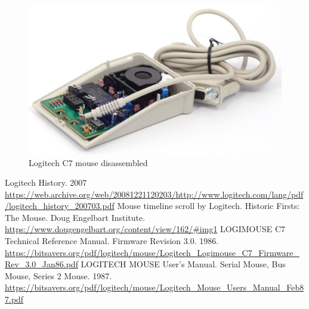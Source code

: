 \documentclass[11pt, a4paper]{article}
\begin{document}
\begin{figure}[h]
    \centering
    \includegraphics[scale=0.7]{1985_logitech_c7_mouse/inside_60.jpg}
    \caption{Logitech C7 mouse disassembled}
    \label{fig:LogitechC7Inside}
\end{figure}

\begin{thebibliography}{9}
 Logitech History. 2007 \url{https://web.archive.org/web/20081221120203/http://www.logitech.com/lang/pdf/logitech_history_200703.pdf}
 Mouse timeline scroll by Logitech. Historic Firsts: The Mouse. Doug Engelbart Institute. \url{https://www.dougengelbart.org/content/view/162/#img1}
 LOGIMOUSE C7 Technical Reference Manual. Firmware Revision 3.0. 1986. \url{https://bitsavers.org/pdf/logitech/mouse/Logitech_Logimouse_C7_Firmware_Rev_3.0_Jan86.pdf}
 LOGITECH MOUSE User's Manual. Serial Mouse, Bus Mouse, Series 2 Mouse. 1987. \url{https://bitsavers.org/pdf/logitech/mouse/Logitech_Mouse_Users_Manual_Feb87.pdf}
\end{thebibliography}
\end{document}
